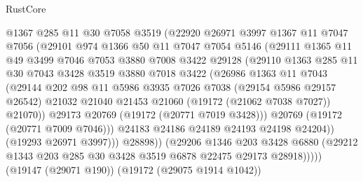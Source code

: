 \begin{lexlean}{RustCore}
\begin{coremodule}
                  @1367
                  @285
                  @11
                  @30
                  @7058
                  @3519
                  (@22920
                    @26971
                    @3997
                    @1367
                    @11
                    @7047
                    @7056
                    (@29101
                      @974
                      @1366
                      @50
                      @11
                      @7047
                      @7054
                      @5146
                      (@29111
                        @1365
                        @11
                        @49
                        @3499
                        @7046
                        @7053
                        @3880
                        @7008
                        @3422
                        @29128
                        (@29110
                          @1363
                          @285
                          @11
                          @30
                          @7043
                          @3428
                          @3519
                          @3880
                          @7018
                          @3422
                          (@26986
                            @1363
                            @11
                            @7043
                            (@29144
                              @202
                              @98
                              @11
                              @5986
                              @3935
                              @7026
                              @7038
                              (@29154 @5986 @29157 @26542)
                              @21032
                              @21040
                              @21453
                              @21060
                              (@19172 (@21062 @7038 @7027))
                              @21070))
                          @29173
                          @20769
                          (@19172 (@20771 @7019 @3428)))
                        @20769
                        (@19172 (@20771 @7009 @7046)))
                      @24183
                      @24186
                      @24189
                      @24193
                      @24198
                      @24204))
                  (@19293 @26971 @3997)))
              @28898))
          (@29206
            @1346
            @203
            @3428
            @6880
            (@29212 @1343 @203 @285 @30 @3428 @3519 @6878 @22475 @29173 @28918)))))
    (@19147 (@29071 @190))
    (@19172 (@29075 @1914 @1042))

\end{coremodule}
\end{lexlean}
